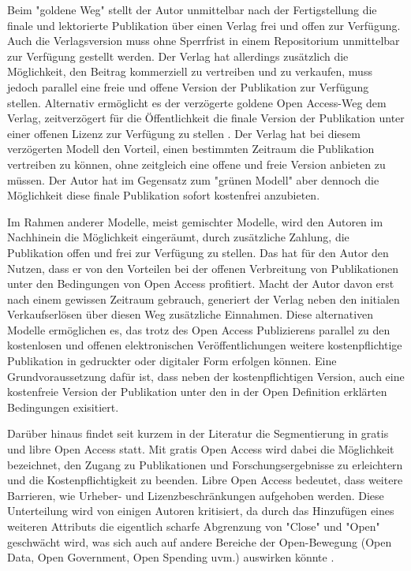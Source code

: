 Beim "goldene Weg" stellt der Autor unmittelbar nach der Fertigstellung die finale und lektorierte Publikation über einen Verlag frei und offen zur Verfügung. Auch die Verlagsversion muss ohne Sperrfrist in einem Repositorium unmittelbar zur Verfügung gestellt werden. Der Verlag hat allerdings zusätzlich die Möglichkeit, den Beitrag kommerziell zu vertreiben und zu verkaufen, muss jedoch parallel eine freie und offene Version der Publikation zur Verfügung stellen. Alternativ ermöglicht es der verzögerte goldene Open Access-Weg dem Verlag, zeitverzögert für die Öffentlichkeit die finale Version der Publikation unter einer offenen Lizenz zur Verfügung zu stellen \cite{lewis_2012_inevitability}. Der Verlag hat bei diesem verzögerten Modell den Vorteil, einen bestimmten Zeitraum die Publikation vertreiben zu können, ohne zeitgleich eine offene und freie Version anbieten zu müssen. Der Autor hat im Gegensatz zum "grünen Modell" aber dennoch die Möglichkeit diese finale Publikation sofort kostenfrei anzubieten.

Im Rahmen anderer Modelle, meist gemischter Modelle, wird den Autoren im Nachhinein die Möglichkeit eingeräumt, durch zusätzliche Zahlung, die Publikation offen und frei zur Verfügung zu stellen\cite{lewis_2012_inevitability}. Das hat für den Autor den Nutzen, dass er von den Vorteilen bei der offenen Verbreitung von Publikationen unter den Bedingungen von Open Access profitiert. Macht der Autor davon erst nach einem gewissen Zeitraum gebrauch, generiert der Verlag neben den initialen Verkaufserlösen über diesen Weg zusätzliche Einnahmen. Diese alternativen Modelle ermöglichen es, das trotz des Open Access Publizierens parallel zu den kostenlosen und offenen elektronischen Veröffentlichungen weitere kostenpflichtige Publikation in gedruckter oder digitaler Form erfolgen können. Eine Grundvoraussetzung dafür ist, dass neben der kostenpflichtigen Version, auch eine kostenfreie Version der Publikation unter den in der Open Definition erklärten Bedingungen exisitiert.

Darüber hinaus findet seit kurzem in der Literatur die Segmentierung in gratis und libre Open Access statt. Mit gratis Open Access wird dabei die Möglichkeit bezeichnet, den Zugang zu Publikationen und Forschungsergebnisse zu erleichtern und die Kostenpflichtigkeit zu beenden. Libre Open Access bedeutet, dass weitere Barrieren, wie Urheber- und Lizenzbeschränkungen aufgehoben werden. \cite{Adema_2014_open_access} Diese Unterteilung wird von einigen Autoren kritisiert, da durch das Hinzufügen eines weiteren Attributs die eigentlich scharfe Abgrenzung von "Close" und "Open" geschwächt wird, was sich auch auf andere Bereiche der Open-Bewegung (Open Data, Open Government, Open Spending uvm.) auswirken könnte \cite{suchen}.

